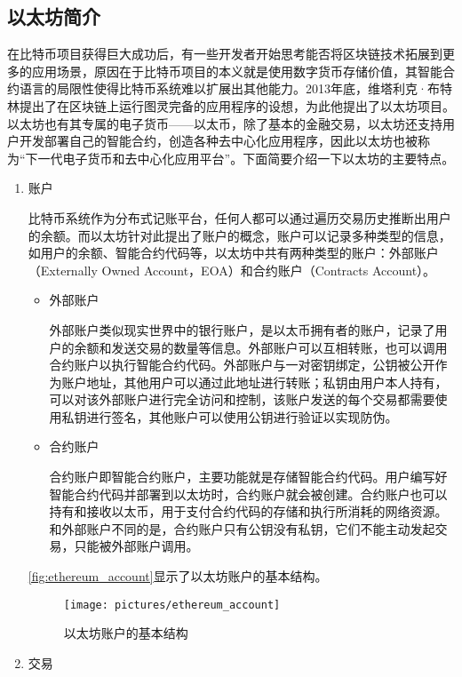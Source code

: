 \subsection{以太坊简介}
在比特币项目获得巨大成功后，有一些开发者开始思考能否将区块链技术拓展到更多的应用场景，原因在于比特币项目的本义就是使用数字货币存储价值，其智能合约语言的局限性使得比特币系统难以扩展出其他能力。2013年底，维塔利克·布特林提出了在区块链上运行图灵完备的应用程序的设想，为此他提出了以太坊项目。以太坊也有其专属的电子货币——以太币，除了基本的金融交易，以太坊还支持用户开发部署自己的智能合约，创造各种去中心化应用程序，因此以太坊也被称为“下一代电子货币和去中心化应用平台”。下面简要介绍一下以太坊的主要特点。
\begin{enumerate}[label=\Alph*., align=left, leftmargin=*]
    \item 账户
    
    比特币系统作为分布式记账平台，任何人都可以通过遍历交易历史推断出用户的余额。而以太坊针对此提出了账户的概念，账户可以记录多种类型的信息，如用户的余额、智能合约代码等，以太坊中共有两种类型的账户：外部账户（Externally Owned Account，EOA）和合约账户（Contracts Account）。
    \begin{itemize}
        \item 外部账户
        
        外部账户类似现实世界中的银行账户，是以太币拥有者的账户，记录了用户的余额和发送交易的数量等信息。外部账户可以互相转账，也可以调用合约账户以执行智能合约代码。外部账户与一对密钥绑定，公钥被公开作为账户地址，其他用户可以通过此地址进行转账；私钥由用户本人持有，可以对该外部账户进行完全访问和控制，该账户发送的每个交易都需要使用私钥进行签名，其他账户可以使用公钥进行验证以实现防伪。
        \item 合约账户
        
        合约账户即智能合约账户，主要功能就是存储智能合约代码。用户编写好智能合约代码并部署到以太坊时，合约账户就会被创建。合约账户也可以持有和接收以太币，用于支付合约代码的存储和执行所消耗的网络资源。和外部账户不同的是，合约账户只有公钥没有私钥，它们不能主动发起交易，只能被外部账户调用。
        
    \end{itemize}
    \autoref{fig:ethereum_account}显示了以太坊账户的基本结构。
    \begin{figure}[htbp]
        \centering
        \texttt{[image: pictures/ethereum\_account]}
        \caption{\label{fig:ethereum_account}以太坊账户的基本结构}
    \end{figure}
    \item 交易
    

\end{enumerate}
